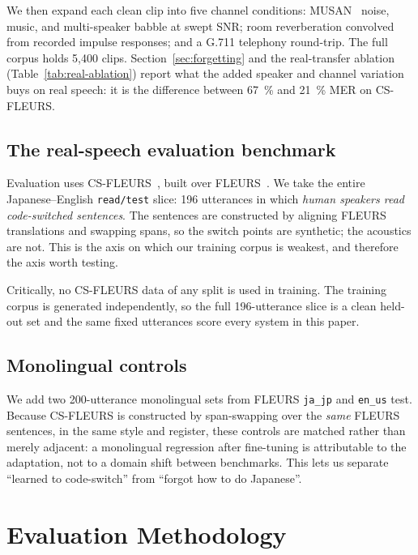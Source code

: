 \documentclass[11pt,a4paper]{article}
\begin{document}
We then expand each clean clip into five channel conditions: MUSAN~\cite{snyder2015musan}
noise, music, and multi-speaker babble at swept SNR; room reverberation convolved
from recorded impulse responses; and a G.711 telephony round-trip. The full corpus
holds 5,400 clips. Section~\ref{sec:forgetting} and the real-transfer ablation
(Table~\ref{tab:real-ablation}) report what the added speaker and channel variation
buys on real speech: it is the difference between \SI{67}{\percent} and
\SI{21}{\percent} MER on CS-FLEURS.

\subsection{The real-speech evaluation benchmark}

Evaluation uses CS-FLEURS~\cite{yan2025csfleurs}, built over
FLEURS~\cite{conneau2023fleurs}. We take the entire Japanese--English
\texttt{read/test} slice: 196 utterances in which \emph{human speakers read
code-switched sentences}. The sentences are constructed by aligning FLEURS
translations and swapping spans, so the switch points are synthetic; the acoustics
are not. This is the axis on which our training corpus is weakest, and therefore
the axis worth testing.

Critically, no CS-FLEURS data of any split is used in training. The training
corpus is generated independently, so the full 196-utterance slice is a clean
held-out set and the same fixed utterances score every system in this paper.

\subsection{Monolingual controls}

We add two 200-utterance monolingual sets from FLEURS \texttt{ja\_jp} and
\texttt{en\_us} test. Because CS-FLEURS is constructed by span-swapping over the
\emph{same} FLEURS sentences, in the same style and register, these controls are
matched rather than merely adjacent: a monolingual regression after fine-tuning is
attributable to the adaptation, not to a domain shift between benchmarks. This
lets us separate ``learned to code-switch'' from ``forgot how to do Japanese''.

\section{Evaluation Methodology}
\label{sec:eval}
\end{document}
